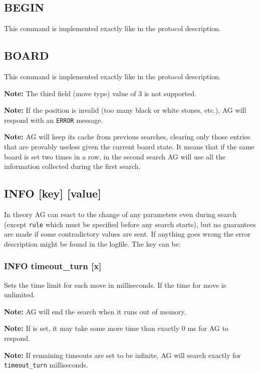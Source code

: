 \documentclass[12pt,a4paper]{article}
\begin{document}
\subsection{BEGIN}
\label{cmd_begin}
This command is implemented exactly like in the protocol description.


\subsection{BOARD}
\label{cmd_board}
This command is implemented exactly like in the protocol description.

\textbf{Note:} The third field (move type) value of 3 is not supported. 

\textbf{Note:} If the position is invalid (too many black or white stones, etc.), AG will respond with an \texttt{ERROR} message.

\textbf{Note:} AG will keep its cache from previous searches, clearing only those entries that are provably useless given the current board state. It means that if the same board is set two times in a row, in the second search AG will use all the information collected during the first search.


\subsection{INFO [key] [value]}
\label{cmd_info}
In theory AG can react to the change of any parameters even during search (except \texttt{rule} which must be specified before any search starts), but no guarantees are made if some contradictory values are sent. If anything goes wrong the error description might be found in the logfile. The key can be:\\

\subsubsection{INFO timeout{\_}turn [x]}
\label{cmd_info_timeout_turn}
Sets the time limit for each move in milliseconds. If  the time for move is unlimited.

\textbf{Note:} AG will end the search when it runs out of memory.

\textbf{Note:} If  is set, it may take some more time than exactly 0 ms for AG to respond.

\textbf{Note:} If remaining timeouts are set to be infinite, AG will search exactly for \texttt{timeout{\_}turn} milliseconds.
\end{document}
